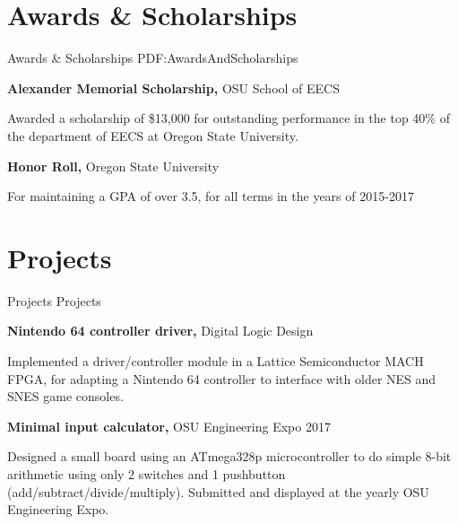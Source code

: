 \documentclass[letterpaper,MMMyyyy,nonstop]{simpleresumecv}
\begin{document}
\begin{body}

\section
{Awards \&\newline
Scholarships}
{Awards \& Scholarships}
{PDF:AwardsAndScholarships}

\textbf{Alexander Memorial Scholarship,}
OSU School of EECS
\GapNoBreak
\begin{detail}
\BulletItem
Awarded a scholarship of \$13,000 for outstanding performance in the top 40\% of the department of EECS at Oregon State University.
\end{detail}

\textbf{Honor Roll,}
Oregon State University
\GapNoBreak
\begin{detail}
\BulletItem
For maintaining a GPA of over 3.5, for all terms in the years of 2015-2017
\end{detail}

\iffalse
\Gap
\textbf{Computer Science Departmental Award,}
Wilsonville High School
\GapNoBreak
\begin{detail}
\BulletItem
Awarded for exemplar efforts in studies in the department of Computer Science; volunteered senior year to create and maintain a computer lab of 32 machines running Xubuntu GNU/Linux for use in Physics, Digital Photography, and AP Computer Science courses; served as peer mentor for AP Computer Science.
\end{detail}
\fi



\section{Projects}
{Projects}
{Projects}

\textbf{Nintendo 64 controller driver,} Digital Logic Design
\GapNoBreak
\begin{detail}
\BulletItem
Implemented a driver/controller module in a Lattice Semiconductor MACH FPGA, for adapting a Nintendo 64 controller to interface with older NES and SNES game consoles.
\end{detail}


\textbf{Minimal input calculator,} OSU Engineering Expo 2017
\GapNoBreak
\begin{detail}
\BulletItem
Designed a small board using an ATmega328p microcontroller to do simple 8-bit arithmetic using only 2 switches and 1 pushbutton (add/subtract/divide/multiply). Submitted and displayed at the yearly OSU Engineering Expo.
\end{detail}


\end{body}
\end{document}
